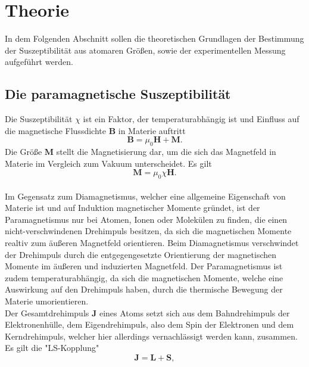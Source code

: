 \section{Theorie}

    In dem Folgenden Abschnitt sollen die theoretischen Grundlagen der Bestimmung der Suszeptibilität aus atomaren Größen,
    sowie der experimentellen Messung aufgeführt werden.

\subsection{Die paramagnetische Suszeptibilität} 

    Die Suszeptibilität $\chi$ ist ein Faktor, 
    der temperaturabhängig ist und Einfluss auf die magnetische Flussdichte $\symbf{B}$ in Materie auftritt %
    \begin{equation}
        \symbf{B} = \mu_0 \symbf{H} + \symbf{M} .
    \end{equation}
    Die Größe $\symbf{M}$ stellt die Magnetisierung dar, 
    um die sich das Magnetfeld in Materie im Vergleich zum Vakuum unterscheidet.
    Es gilt
    \begin{equation}
        \symbf{M} = \mu_0 \chi \symbf{H} . \label{eqn:Magnetisierung}
    \end{equation}
    \\
    Im Gegensatz zum Diamagnetismus, 
    welcher eine allgemeine Eigenschaft von Materie ist und auf Induktion magnetischer Momente gründet,
    ist der Paramagnetismus nur bei Atomen, Ionen oder Molekülen zu finden,
    die einen nicht-verschwindenen Drehimpuls besitzen,
    da sich die magnetischen Momente realtiv zum äußeren Magnetfeld orientieren.
    Beim Diamagnetismus verschwindet der Drehimpuls durch die entgegengesetzte Orientierung der magnetischen Momente
    im äußeren und induzierten Magnetfeld.
    Der Paramagnetismus ist zudem temperaturabhängig, 
    da sich die magnetischen Momente,
    welche eine Auswirkung auf den Drehimpuls haben,
    durch die thermische Bewegung der Materie umorientieren.\\
    Der Gesamtdrehimpuls $\symbf{J}$ eines Atoms setzt sich aus dem Bahndrehimpuls der Elektronenhülle,
    dem Eigendrehimpuls, also dem Spin der Elektronen und dem Kerndrehimpuls,
    welcher hier allerdings vernachlässigt werden kann,
    zusammen.\\
    Es gilt die "LS-Kopplung"
    \begin{equation}
        \symbf{J} = \symbf{L} + \symbf{S} ,
    \end{equation}
